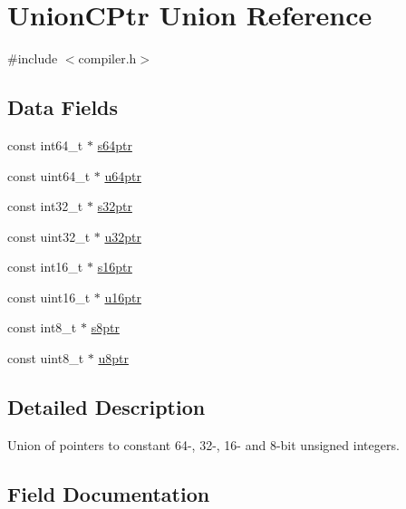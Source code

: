 \hypertarget{union_union_c_ptr}{}\section{Union\+C\+Ptr Union Reference}
\label{union_union_c_ptr}


{\ttfamily \#include $<$compiler.\+h$>$}

\subsection*{Data Fields}
\begin{DoxyCompactItemize}
\item 
const int64\+\_\+t $\ast$ \mbox{\hyperlink{union_union_c_ptr_ac9ea294aaa07e5a63204530ebf3dd3d2}{s64ptr}}
\item 
const uint64\+\_\+t $\ast$ \mbox{\hyperlink{union_union_c_ptr_abbc67642e882a52be564515f1c8f12cb}{u64ptr}}
\item 
const int32\+\_\+t $\ast$ \mbox{\hyperlink{union_union_c_ptr_af6182ebecd1280fa1714762f2d81d5d3}{s32ptr}}
\item 
const uint32\+\_\+t $\ast$ \mbox{\hyperlink{union_union_c_ptr_a12f0da0bcf30aca9703630565d8be204}{u32ptr}}
\item 
const int16\+\_\+t $\ast$ \mbox{\hyperlink{union_union_c_ptr_a153aa1a4a18fe39a05be056a372d19c9}{s16ptr}}
\item 
const uint16\+\_\+t $\ast$ \mbox{\hyperlink{union_union_c_ptr_a4ff05b3b8a78949bf0036fe340b98b05}{u16ptr}}
\item 
const int8\+\_\+t $\ast$ \mbox{\hyperlink{union_union_c_ptr_a2e21f1ae56dd4da3f534ccebfa234fcc}{s8ptr}}
\item 
const uint8\+\_\+t $\ast$ \mbox{\hyperlink{union_union_c_ptr_acb08e5689c70ca4ef5e0d984f15f47ae}{u8ptr}}
\end{DoxyCompactItemize}


\subsection{Detailed Description}
Union of pointers to constant 64-\/, 32-\/, 16-\/ and 8-\/bit unsigned integers. 

\subsection{Field Documentation}
\mbox{\label{union_union_c_ptr_a153aa1a4a18fe39a05be056a372d19c9}} 
